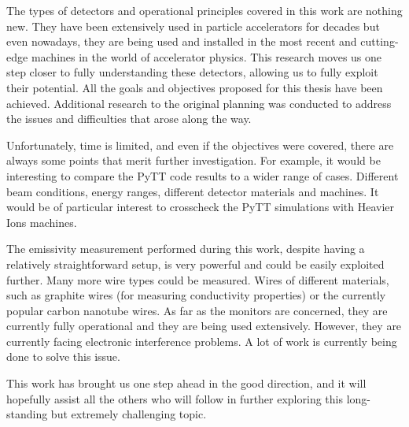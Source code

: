 The types of detectors and operational principles covered in this work are nothing new. They have been extensively used in particle accelerators for decades but even nowadays, they are being used and installed in the most recent and cutting-edge machines in the world of accelerator physics. This research moves us one step closer to fully understanding these detectors, allowing us to fully exploit their potential. All the goals and objectives proposed for this thesis have been achieved. Additional research to the original planning was conducted to address the issues and difficulties that arose along the way.  

Unfortunately, time is limited, and even if the objectives were covered, there are always some points that merit further investigation. For example, it would be interesting to compare the PyTT code results to a wider range of cases. Different beam conditions, energy ranges, different detector materials and machines. It would be of particular interest to crosscheck the PyTT simulations with Heavier Ions machines.

The emissivity measurement performed during this work, despite having a relatively straightforward setup, is very powerful and could be easily exploited further. Many more wire types could be measured. Wires of different materials, such as graphite wires (for measuring conductivity properties) or the currently popular carbon nanotube wires.  As far as the \hzhm monitors are concerned, they are currently fully operational and they are being used extensively. However, they are currently facing electronic interference problems. A lot of work is currently being done to solve this issue.  

This work has brought us one step ahead in the good direction, and it will hopefully assist all the others who will follow in further exploring this long-standing but extremely challenging topic.